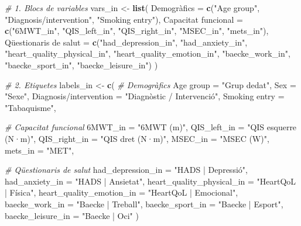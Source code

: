 \documentclass[CAT]{TFUOC}%
\newenvironment{Shaded}{\begin{snugshade}}{\end{snugshade}}
\newcommand{\AttributeTok}[1]{\textcolor[rgb]{0.13,0.29,0.53}{#1}}
\newcommand{\CommentTok}[1]{\textcolor[rgb]{0.56,0.35,0.01}{\textit{#1}}}
\newcommand{\FunctionTok}[1]{\textcolor[rgb]{0.13,0.29,0.53}{\textbf{#1}}}
\newcommand{\NormalTok}[1]{#1}
\newcommand{\OtherTok}[1]{\textcolor[rgb]{0.56,0.35,0.01}{#1}}
\newcommand{\StringTok}[1]{\textcolor[rgb]{0.31,0.60,0.02}{#1}}
\begin{document}
\begin{Shaded}
\begin{Highlighting}[]
\CommentTok{\# 1. Blocs de variables}
\NormalTok{vars\_in }\OtherTok{\textless{}{-}} \FunctionTok{list}\NormalTok{(}
  \StringTok{\textasciigrave{}}\AttributeTok{Demogràfics}\StringTok{\textasciigrave{}} \OtherTok{=} \FunctionTok{c}\NormalTok{(}\StringTok{"Age group"}\NormalTok{, }\StringTok{"Diagnosis/intervention"}\NormalTok{, }\StringTok{"Smoking entry"}\NormalTok{),}
  \StringTok{\textasciigrave{}}\AttributeTok{Capacitat funcional}\StringTok{\textasciigrave{}} \OtherTok{=} \FunctionTok{c}\NormalTok{(}\StringTok{"6MWT\_in"}\NormalTok{, }\StringTok{"QIS\_left\_in"}\NormalTok{, }\StringTok{"QIS\_right\_in"}\NormalTok{, }
                            \StringTok{"MSEC\_in"}\NormalTok{, }\StringTok{"mets\_in"}\NormalTok{),}
  \StringTok{\textasciigrave{}}\AttributeTok{Qüestionaris de salut}\StringTok{\textasciigrave{}} \OtherTok{=} \FunctionTok{c}\NormalTok{(}\StringTok{"had\_depression\_in"}\NormalTok{, }\StringTok{"had\_anxiety\_in"}\NormalTok{, }
                              \StringTok{"heart\_quality\_physical\_in"}\NormalTok{, }
                              \StringTok{"heart\_quality\_emotion\_in"}\NormalTok{, }\StringTok{"baecke\_work\_in"}\NormalTok{, }
                              \StringTok{"baecke\_sport\_in"}\NormalTok{, }\StringTok{"baecke\_leisure\_in"}\NormalTok{)}
\NormalTok{)}

\CommentTok{\# 2. Etiquetes}
\NormalTok{labels\_in }\OtherTok{\textless{}{-}} \FunctionTok{c}\NormalTok{(}
  \CommentTok{\# Demogràfics}
  \StringTok{\textasciigrave{}}\AttributeTok{Age group}\StringTok{\textasciigrave{}} \OtherTok{=} \StringTok{"Grup d\textquotesingle{}edat"}\NormalTok{, }
  \AttributeTok{Sex =} \StringTok{"Sexe"}\NormalTok{, }
  \StringTok{\textasciigrave{}}\AttributeTok{Diagnosis/intervention}\StringTok{\textasciigrave{}} \OtherTok{=} \StringTok{"Diagnòstic / Intervenció"}\NormalTok{, }
  \StringTok{\textasciigrave{}}\AttributeTok{Smoking entry}\StringTok{\textasciigrave{}} \OtherTok{=} \StringTok{"Tabaquisme"}\NormalTok{, }
  
  \CommentTok{\# Capacitat funcional}
  \StringTok{\textasciigrave{}}\AttributeTok{6MWT\_in}\StringTok{\textasciigrave{}} \OtherTok{=} \StringTok{"6MWT (m)"}\NormalTok{, }
  \AttributeTok{QIS\_left\_in =} \StringTok{"QIS esquerre (N·m)"}\NormalTok{, }
  \AttributeTok{QIS\_right\_in =} \StringTok{"QIS dret (N·m)"}\NormalTok{, }
  \AttributeTok{MSEC\_in =} \StringTok{"MSEC (W)"}\NormalTok{, }
  \AttributeTok{mets\_in =} \StringTok{"MET"}\NormalTok{, }
  
  \CommentTok{\# Qüestionaris de salut}
  \AttributeTok{had\_depression\_in =} \StringTok{"HADS | Depressió"}\NormalTok{, }
  \AttributeTok{had\_anxiety\_in =} \StringTok{"HADS | Ansietat"}\NormalTok{, }
  \AttributeTok{heart\_quality\_physical\_in =} \StringTok{"HeartQoL | Física"}\NormalTok{, }
  \AttributeTok{heart\_quality\_emotion\_in =} \StringTok{"HeartQoL | Emocional"}\NormalTok{, }
  \AttributeTok{baecke\_work\_in =} \StringTok{"Baecke | Treball"}\NormalTok{, }
  \AttributeTok{baecke\_sport\_in =} \StringTok{"Baecke | Esport"}\NormalTok{, }
  \AttributeTok{baecke\_leisure\_in =} \StringTok{"Baecke | Oci"}
\NormalTok{)}


\end{Highlighting}
\end{Shaded}
\end{document}
